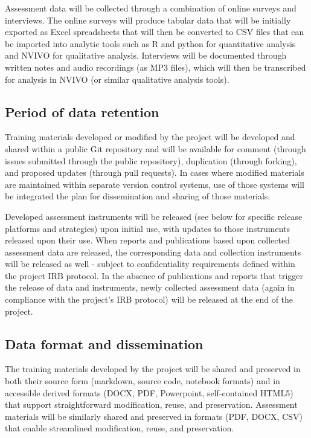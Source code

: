 \documentclass[11pt]{article}
\begin{document}
Assessment data will be collected through a combination of online surveys and interviews. The online surveys will produce tabular data that will be initially exported as Excel spreadsheets that will then be converted to CSV files that can be imported into analytic tools such as R and python for quantitative analysis and NVIVO for qualitative analysis. Interviews will be documented through written notes and audio recordings (as MP3 files), which will then be transcribed for analysis in NVIVO (or similar qualitative analysis tools).

\subsection*{Period of data retention}\label{period-of-data-retention}

Training materials developed or modified by the project will be developed and shared within a public Git repository and will be available for comment (through issues submitted through the public repository), duplication (through forking), and proposed updates (through pull requests). In cases where modified materials are maintained within separate version control systems, use of those systems will be integrated the plan for dissemination and sharing of those materials. 

Developed assessment instruments will be released (see below for specific release platforms and strategies) upon initial use, with updates to those instruments released upon their use. When reports and publications based upon collected assessment data are released, the corresponding data and collection instruments will be released as well - subject to confidentiality requirements defined within the project IRB protocol. In the absence of publications and reports that trigger the release of data and instruments, newly collected assessment data (again in compliance with the project's IRB protocol) will be released at the end of the project.

\subsection*{Data format and
dissemination}\label{data-format-and-dissemination}

The training materials developed by the project will be shared and preserved in both their source form (markdown, source code, notebook formats) and in accessible derived formats (DOCX, PDF, Powerpoint, self-contained HTML5) that support straightforward modification, reuse, and preservation. Assessment materials will be similarly shared and preserved in formats (PDF, DOCX, CSV) that enable streamlined modification, reuse, and preservation. 
\end{document}
